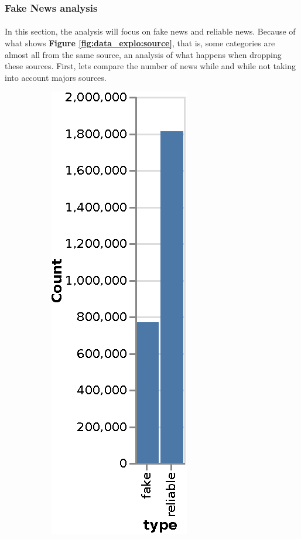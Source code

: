 \subsubsection{Fake News analysis}
\paragraph{} In this section, the analysis will focus on fake news and reliable news. Because of what shows \textbf{Figure \ref{fig:data_explo:source}}, that is, some categories are almost all from the same source, an analysis of what happens when dropping these sources. First, lets compare the number of news while and while not taking into account majors sources. 

\begin{figure}[h]
  \centering
  \begin{subfigure}[b]{0.4\textwidth}
     \centering
     \includegraphics[]{chapter/images/data_exploration/notdown_hist.eps}

\end{subfigure}
\end{figure}

